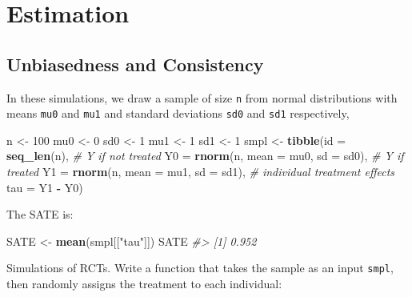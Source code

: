 \documentclass[]{book}
\newenvironment{Shaded}{\begin{snugshade}}{\end{snugshade}}
\newcommand{\KeywordTok}[1]{\textcolor[rgb]{0.13,0.29,0.53}{\textbf{#1}}}
\newcommand{\DataTypeTok}[1]{\textcolor[rgb]{0.13,0.29,0.53}{#1}}
\newcommand{\DecValTok}[1]{\textcolor[rgb]{0.00,0.00,0.81}{#1}}
\newcommand{\StringTok}[1]{\textcolor[rgb]{0.31,0.60,0.02}{#1}}
\newcommand{\CommentTok}[1]{\textcolor[rgb]{0.56,0.35,0.01}{\textit{#1}}}
\newcommand{\OperatorTok}[1]{\textcolor[rgb]{0.81,0.36,0.00}{\textbf{#1}}}
\newcommand{\NormalTok}[1]{#1}
\theoremstyle{definition}
\theoremstyle{definition}
\theoremstyle{definition}
\theoremstyle{remark}
\begin{document}
\section{Estimation}\label{estimation}

\subsection{Unbiasedness and
Consistency}\label{unbiasedness-and-consistency}

In these simulations, we draw a sample of size \texttt{n} from normal
distributions with means \texttt{mu0} and \texttt{mu1} and standard
deviations \texttt{sd0} and \texttt{sd1} respectively,

\begin{Shaded}
\begin{Highlighting}[]
\NormalTok{n <-}\StringTok{ }\DecValTok{100}
\NormalTok{mu0 <-}\StringTok{ }\DecValTok{0}
\NormalTok{sd0 <-}\StringTok{ }\DecValTok{1}
\NormalTok{mu1 <-}\StringTok{ }\DecValTok{1}
\NormalTok{sd1 <-}\StringTok{ }\DecValTok{1}
\NormalTok{smpl <-}\StringTok{ }\KeywordTok{tibble}\NormalTok{(}\DataTypeTok{id =} \KeywordTok{seq_len}\NormalTok{(n),}
               \CommentTok{# Y if not treated}
               \DataTypeTok{Y0 =} \KeywordTok{rnorm}\NormalTok{(n, }\DataTypeTok{mean =}\NormalTok{ mu0, }\DataTypeTok{sd =}\NormalTok{ sd0),}
               \CommentTok{# Y if treated}
               \DataTypeTok{Y1 =} \KeywordTok{rnorm}\NormalTok{(n, }\DataTypeTok{mean =}\NormalTok{ mu1, }\DataTypeTok{sd =}\NormalTok{ sd1),}
               \CommentTok{# individual treatment effects}
               \DataTypeTok{tau =}\NormalTok{ Y1 }\OperatorTok{-}\StringTok{ }\NormalTok{Y0)}
\end{Highlighting}
\end{Shaded}

The SATE is:

\begin{Shaded}
\begin{Highlighting}[]
\NormalTok{SATE <-}\StringTok{ }\KeywordTok{mean}\NormalTok{(smpl[[}\StringTok{"tau"}\NormalTok{]])}
\NormalTok{SATE}
\CommentTok{#> [1] 0.952}
\end{Highlighting}
\end{Shaded}

Simulations of RCTs. Write a function that takes the sample as an input
\texttt{smpl}, then randomly assigns the treatment to each individual:
\end{document}
